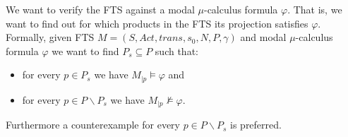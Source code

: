 We want to verify the FTS against a modal $\mu$-calculus formula $\varphi$. That is, we want to find out for which products in the FTS its projection satisfies $\varphi$. Formally, given FTS $M = (S, Act, trans, s_0, N, P, \gamma)$ and modal $\mu$-calculus formula $\varphi$ we want to find $P_s \subseteq P$ such that:
\begin{itemize}
	\item for every $p \in P_s$ we have $M_{|p} \models \varphi$ and
	\item for every $p \in P \backslash P_s$ we have $M_{|p} \not\models \varphi$.
\end{itemize}
Furthermore a counterexample for every $p \in P \backslash P_s$ is preferred.